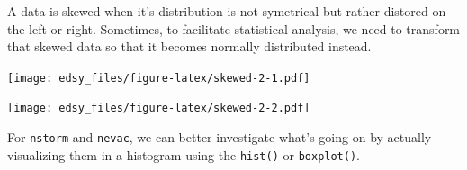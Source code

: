 \documentclass[
]{book}
\newenvironment{Shaded}{\begin{snugshade}}{\end{snugshade}}
\newcommand{\CommentTok}[1]{\textcolor[rgb]{0.56,0.35,0.01}{\textit{#1}}}
\newcommand{\DataTypeTok}[1]{\textcolor[rgb]{0.13,0.29,0.53}{#1}}
\newcommand{\DecValTok}[1]{\textcolor[rgb]{0.00,0.00,0.81}{#1}}
\newcommand{\KeywordTok}[1]{\textcolor[rgb]{0.13,0.29,0.53}{\textbf{#1}}}
\newcommand{\NormalTok}[1]{#1}
\newcommand{\OperatorTok}[1]{\textcolor[rgb]{0.81,0.36,0.00}{\textbf{#1}}}
\newcommand{\StringTok}[1]{\textcolor[rgb]{0.31,0.60,0.02}{#1}}
\begin{document}
A data is skewed when it's distribution is not symetrical but rather distored on the left or right. Sometimes, to facilitate statistical analysis, we need to transform that skewed data so that it becomes normally distributed instead.

\begin{Shaded}
\end{Shaded}

\texttt{[image: edsy\_files/figure-latex/skewed-2-1.pdf]}

\begin{Shaded}
\end{Shaded}

\texttt{[image: edsy\_files/figure-latex/skewed-2-2.pdf]}

For \texttt{nstorm} and \texttt{nevac}, we can better investigate what's going on by actually visualizing them in a histogram using the \texttt{hist()} or \texttt{boxplot()}.
\end{document}
